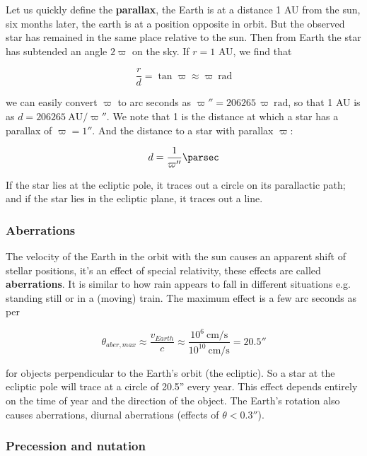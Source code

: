 \documentclass[a4paper]{article}
\begin{document}
Let us quickly define the \textbf{parallax}, the Earth is at a distance 1 AU from the sun, six months later, the earth is at a position opposite in orbit. But the observed star has remained in the same place relative to the sun. Then from Earth the star has subtended an angle $2\varpi$ on the sky. If $r=1$ AU, we find that 

\begin{equation}
    \frac{r}{d}=\tan\varpi\approx \varpi \ \text{rad}
\end{equation}

we can easily convert $\varpi$ to arc seconds as $\varpi ''=206265\,\varpi \ \text{rad}$, so that 1 AU is as $d=206265\ \text{AU}/\varpi''$. We note that 1 \si{\parsec} is the distance at which a star has a parallax of $\varpi=1''$. And the distance to a star with parallax $\varpi$:

\begin{equation}
    d=\frac{1}{\varpi''}\si{\parsec}
\end{equation}

If the star lies at the ecliptic pole, it traces out a circle on its parallactic path; and if the star lies in the ecliptic plane, it traces out a line.

\subsubsection*{Aberrations}

The velocity of the Earth in the orbit with the sun causes an apparent shift of stellar positions, it's an effect of special relativity, these effects are called \textbf{aberrations}. It is similar to how rain appears to fall in different situations e.g. standing still or in a (moving) train. The maximum effect is a few arc seconds as per

\begin{equation}
    \theta_{aber, max} \approx \frac{v_{Earth}}{c}\approx \frac{10^6\ \si{\centi\meter\per\second}}{10^{10}\ \si{\centi\meter\per\second}}=20.5''
\end{equation}

for objects perpendicular to the Earth's orbit (the ecliptic). So a star at the ecliptic pole will trace at a circle of 20.5'' every year. This effect depends entirely on the time of year and the direction of the object. The Earth's rotation also causes aberrations, diurnal aberrations (effects of $\theta<0.3''$).

\subsubsection*{Precession and nutation}
\end{document}
